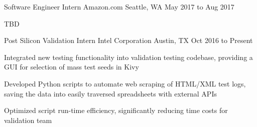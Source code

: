 \begin{cventries}
  \cventry
    {Software Engineer Intern}
    {Amazon.com}
    {Seattle, WA}
    {May 2017 to Aug 2017}
    {
      \begin{cvitems}
        \item {TBD}
      \end{cvitems}
    }
  \cventry
    {Post Silicon Validation Intern}
    {Intel Corporation}
    {Austin, TX}
    {Oct 2016 to Present}
    {
      \begin{cvitems}
        \item {Integrated new testing functionality into validation testing codebase, providing a GUI for selection of mass test seeds in Kivy}
        \item {Developed Python scripts to automate web scraping of HTML/XML test logs, saving the data into easily traversed spreadsheets with external APIs}
        \item {Optimized script run-time efficiency, significantly reducing time costs for validation team}
      \end{cvitems}
    }
\end{cventries}
